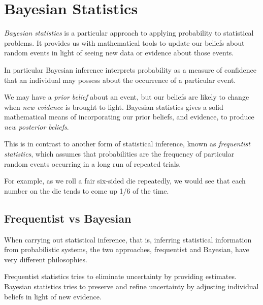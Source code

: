 \chapter{Bayesian Statistics}
\label{cap:bayes}

\emph{Bayesian statistics} is a particular approach to applying probability to statistical problems. It provides us with mathematical tools to update our beliefs about random events in light of seeing new data or evidence about those events.

In particular Bayesian inference interprets probability as a measure of confidence that an individual may possess about the occurrence of a particular event.

We may have a \emph{prior belief} about an event, but our beliefs are likely to change when \emph{new evidence} is brought to light. Bayesian statistics gives a solid mathematical means of incorporating our prior beliefs, and evidence, to produce \emph{new posterior beliefs}.

This is in contrast to another form of statistical inference, known as \emph{frequentist statistics}, which assumes that probabilities are the frequency of particular random events occurring in a long run of repeated trials.

For example, as we roll a fair six-sided die repeatedly, we would see that each number on the die tends to come up 1/6 of the time.

\section{Frequentist vs Bayesian}
When carrying out statistical inference, that is, inferring statistical information from probabilistic systems, the two approaches, frequentist and Bayesian, have very different philosophies.

Frequentist statistics tries to eliminate uncertainty by providing estimates. Bayesian statistics tries to preserve and refine uncertainty by adjusting individual beliefs in light of new evidence.


